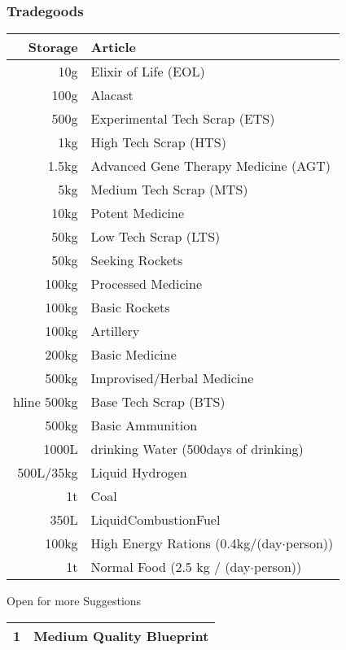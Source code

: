 \documentclass{article}
\begin{document}
    \subsubsection{Tradegoods}
    \begin{tabular}{|r|l|}
        \hline
        Storage & Article\\\hline
         10g & Elixir of Life (EOL)\\\hline
        100g & Alacast\\\hline
        500g & Experimental Tech Scrap (ETS)\\\hline
        1kg & High Tech Scrap (HTS)\\\hline
        1.5kg & Advanced Gene Therapy Medicine (AGT)\\\hline
        5kg & Medium Tech Scrap (MTS)\\\hline
        10kg & Potent Medicine\\\hline
        50kg & Low Tech Scrap (LTS)\\\hline
        50kg & Seeking Rockets\\\hline
        100kg & Processed Medicine\\\hline
        100kg & Basic Rockets\\\hline
        100kg & Artillery\\\hline
        200kg & Basic Medicine\\\hline
        500kg & Improvised/Herbal Medicine\\hline
        500kg & Base Tech Scrap (BTS)\\\hline
        500kg & Basic Ammunition\\\hline
        1000L & drinking Water (500days of drinking)\\\hline
        500L/35kg & Liquid Hydrogen\\\hline
        1t & Coal\\\hline
        350L & LiquidCombustionFuel\\\hline
        100kg & High Energy Rations (0.4kg/(day\(\cdot\)person))\\\hline
        1t & Normal Food (2.5 kg / (day\(\cdot\)person))\\\hline

    \end{tabular}\par
    Open for more Suggestions\newline
    \begin{tabular}{|r|l|}
            1 & Medium Quality Blueprint\\\hline
    \end{tabular}
\end{document}
